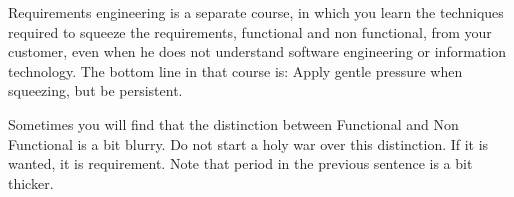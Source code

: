 \documentclass[\docroot/main]{subfiles}
\begin{document}
Requirements engineering is a separate course, in which you learn the
techniques required to squeeze the requirements, functional and non
functional, from your customer, even when he does not understand
software engineering or information technology. The bottom line in
that course is: Apply gentle pressure when squeezing, but be persistent. 

Sometimes you will find that the distinction between Functional and
Non Functional is a bit blurry. Do not start a holy war over this
distinction. If it is wanted, it is requirement. Note that  period in
the previous sentence is a bit thicker.
\end{document}
